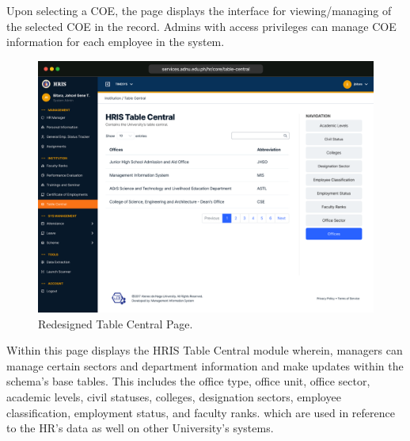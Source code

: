     Upon selecting a COE, the page displays the interface for viewing/managing of the selected COE in the record. Admins with access privileges can manage COE information for each employee in the system.

    \begin{figure}[H]
        \centering
        \includegraphics[width=1\linewidth]{figures/app/table-central.png}
        \caption{Redesigned Table Central Page.}
        \label{fig:app-table-central}
    \end{figure}

    Within this page displays the HRIS Table Central module wherein, managers can manage certain sectors and department information and make updates within the schema's base tables. This includes the office type, office unit, office sector, academic levels, civil statuses, colleges, designation sectors, employee classification, employment status, and faculty ranks. which are used in reference to the HR's data as well on other University's systems.


